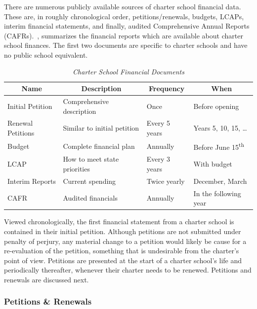 There are numerous publicly available sources of charter school financial data. These are, in roughly chronological order, petitions/renewals, budgets, LCAPs,  interim financial statements, and finally, audited Comprehensive Annual Reports (CAFRs). , summarizes the financial reports which are available about charter school finances. The first two documents are specific to charter schools and have no public school equivalent.

\begin{table}[h]
  \centering\small%
  \caption[Charter School Financial Documents]{\textit{Charter School Financial Documents}}\label{tab:charter-fin-docs}%
  \begin{tabular}{llll}
    \toprule%
    \multicolumn{1}{c}{Name}  & \multicolumn{1}{c}{Description} & \multicolumn{1}{c}{Frequency} & \multicolumn{1}{c}{When} \\
    \midrule%
    Initial Petition  & Comprehensive description    & Once           & Before opening \\
    Renewal Petitions &  Similar to initial petition & Every 5 years  & Years 5, 10, 15, \ldots \\
    Budget            & Complete financial plan      & Annually       & Before June 15\textsuperscript{th} \\
    LCAP              & How to meet state priorities & Every 3 years  & With budget\\
    Interim Reports   & Current spending             & Twice yearly   & December, March \\
    CAFR              & Audited financials           & Annually       & In the following year \\
    \bottomrule%
  \end{tabular}
\end{table}%

Viewed chronologically, the first financial statement from a charter school is contained in their initial petition. Although petitions are not submitted under penalty of perjury, any material change to a petition would likely be cause for a re-evaluation of the petition, something that is undesirable from the charter's point of view. Petitions are presented at the start of a charter school's life and periodically thereafter, whenever their charter needs to be renewed. Petitions and renewals are discussed next.

\subsubsection{Petitions \& Renewals}\label{sec:petitions-renewals}\indent

